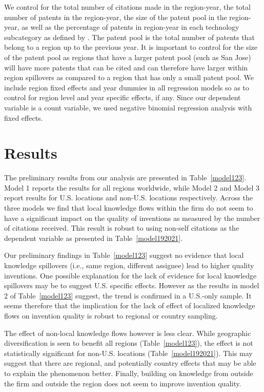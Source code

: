 \documentclass[parskip=full,12pt,letterpaper]{article}
\begin{document}
We control for the total number of citations made in the region-year, the total number of patents in the region-year, the size of the patent pool in the region-year, as well as the percentage of patents in region-year in each technology subcategory as defined by \cite*{Hall2001a}. The patent pool is the total number of patents that belong to a region up to the previous year. It is important to control for the size of the patent pool as  regions that have a larger patent pool (such as San Jose) will have more patents that can be cited and can therefore have larger within region spillovers as compared to a region that has only a small patent pool. We include region fixed effects and year dummies in all regression models so as to control for region level and year specific effects, if any. Since our dependent variable is a count variable, we used negative binomial regression analysis with fixed effects. \par

\section*{Results}
The preliminary results from our analysis are presented in Table~\ref{model123}. Model 1 reports the results for all regions worldwide, while Model 2 and Model 3 report results for U.S. locations and non-U.S. locations respectively. Across the three models we find that local knowledge flows within the firm do not seem to have a significant impact on the quality of inventions as measured by the number of citations received. This result is robust to using non-self citations as the dependent variable as presented in Table~\ref{model192021}. \par
Our preliminary findings in Table~\ref{model123} suggest no evidence that local knowledge spillovers (i.e., same region, different assignee) lead to higher quality inventions.  One possible explanation for the lack of evidence for local knowledge spillovers may be to suggest U.S. specific effects. However as the results in model 2 of Table~\ref{model123} suggest, the trend is confirmed in a U.S.-only sample. It seems therefore that the implication for the lack of effect of localized knowledge flows on invention quality is robust to regional or country sampling. \par
The effect of non-local knowledge flows however is less clear. While geographic diversification is seen to benefit all regions (Table~\ref{model123}), the effect is not statistically significant for non-U.S. locations (Table~\ref{model192021}). This may suggest that there are regional, and potentially country effects that may be able to explain the phenomenon better. Finally, building on knowledge from outside the firm and outside the region does not seem to improve invention quality.\par
\end{document}
